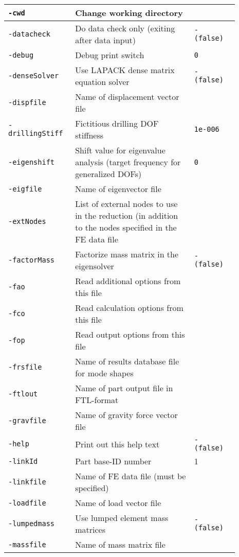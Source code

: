 {\begin{tabular}{|>{\raggedright} p{0.23\linewidth}| p{0.48\linewidth}| p{0.18\linewidth}|}
  \hline
  \texttt{-cwd} &  Change working directory &   \\
  \hline
  \texttt{-datacheck} &  Do data check only (exiting after data input) & \texttt{- (false)}  \\
  \hline
  \texttt{-debug} &  Debug print switch & \texttt{0}  \\
  \hline
  \texttt{-denseSolver} &  Use LAPACK dense matrix equation solver & \texttt{- (false)}  \\
  \hline
  \texttt{-dispfile} &  Name of displacement vector file &   \\ \hline
  \texttt{-drillingStiff} &  Fictitious drilling DOF stiffness & \texttt{1e-006}  \\
  \hline
  \texttt{-eigenshift} &  Shift value for eigenvalue analysis (target
                          frequency for generalized DOFs) & \texttt{0}  \\
  \hline
  \texttt{-eigfile} &  Name of eigenvector file &   \\
  \hline
  \texttt{-extNodes} &  List of external nodes to use in the reduction
                       (in addition to the nodes specified in the FE data file &   \\
  \hline
  \texttt{-factorMass} &  Factorize mass matrix in the eigensolver & \texttt{- (false)}  \\
  \hline
  \texttt{-fao} &  Read additional options from this file &   \\
  \hline
  \texttt{-fco} &  Read calculation options from this file &  \\
  \hline
  \texttt{-fop} &  Read output options from this file &   \\
  \hline
  \texttt{-frsfile} &   Name of results database file for mode shapes &   \\
  \hline
  \texttt{-ftlout} &   Name of part output file in FTL-format  &   \\
  \hline
  \texttt{-gravfile} &   Name of gravity force vector file  &   \\
  \hline
  \texttt{-help} &   Print out this help text  & \texttt{- (false)}  \\
  \hline
  {\tt-linkId} & Part base-ID number & 1 \\
  \hline
  {\tt-linkfile} & Name of FE data file (must be specified) & \\
  \hline
  {\tt-loadfile} & Name of load vector file & \\
  \hline
  {\tt-lumpedmass} & Use lumped element mass matrices & {\tt- (false)}  \\
  \hline
  {\tt-massfile} & Name of mass matrix file & \\
  \hline
\end{tabular}}

